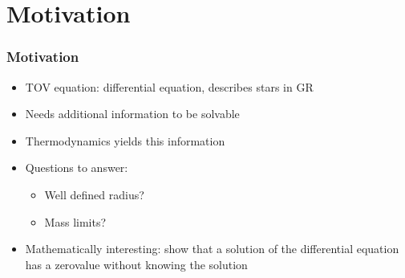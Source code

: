 \section*{Motivation}
\begin{frame}
	\frametitle{Motivation}
	\begin{itemize}[<+->]
		\item TOV equation: differential equation, describes stars in GR
		\item Needs additional information to be solvable
		\item Thermodynamics yields this information
		\item Questions to answer:
		\begin{itemize}
			\item Well defined radius?
			\item Mass limits?
		\end{itemize}
		\item Mathematically interesting: show that a solution of the differential equation has a zerovalue without knowing the solution
	\end{itemize} 
\end{frame}
